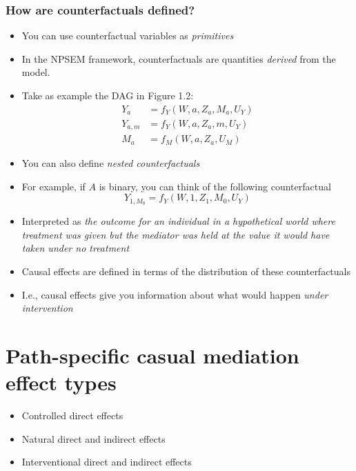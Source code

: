 \documentclass[
  12pt,
]{book}
\providecommand{\tightlist}{%
  \setlength{\itemsep}{0pt}\setlength{\parskip}{0pt}}
\theoremstyle{definition}
\theoremstyle{definition}
\theoremstyle{definition}
\newcommand{\1}{\mathbbm{1}}
\begin{document}
\hypertarget{how-are-counterfactuals-defined}{%
\subsection{How are counterfactuals defined?}\label{how-are-counterfactuals-defined}}

\begin{itemize}
\tightlist
\item
  You can use counterfactual variables as \emph{primitives}
\item
  In the NPSEM framework, counterfactuals are quantities \emph{derived} from the
  model.
\item
  Take as example the DAG in Figure 1.2:
  \begin{align}
    Y_a  &= f_Y(W, a, Z_a, M_a, U_Y)\\
    Y_{a,m}  &= f_Y(W, a, Z_a, m, U_Y)\\
    M_a  &= f_M(W, a, Z_a, U_M)
  \end{align}
\item
  You can also define \emph{nested counterfactuals}
\item
  For example, if \(A\) is binary, you can think of the following counterfactual
  \begin{equation*}
    Y_{1, M_0} = f_Y(W, 1, Z_1, M_0, U_Y)
  \end{equation*}
\item
  Interpreted as \emph{the outcome for an individual in a hypothetical world where
  treatment was given but the mediator was held at the value it would have
  taken under no treatment}
\item
  Causal effects are defined in terms of the distribution of these counterfactuals
\item
  I.e., causal effects give you information about what would happen \emph{under intervention}
\end{itemize}

\hypertarget{estimands}{%
\chapter{Path-specific casual mediation effect types}\label{estimands}}

\begin{itemize}
\tightlist
\item
  Controlled direct effects
\item
  Natural direct and indirect effects
\item
  Interventional direct and indirect effects
\end{itemize}
\end{document}
